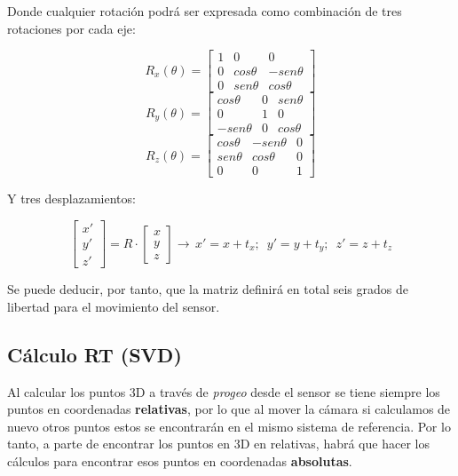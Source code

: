 Donde cualquier rotación podrá ser expresada como combinación de tres rotaciones por cada eje:

\begin{equation}
R_{x}(\theta)=\left[\begin{array}{ccc}
1 & 0 & 0\\
0 & cos\theta & -sen\theta\\
0 & sen\theta & cos\theta
\end{array}\right]
\end{equation}
\begin{equation}
R_{y}(\theta)=\left[\begin{array}{ccc}
cos\theta & 0 & sen\theta\\
0 & 1 & 0\\
-sen\theta & 0 & cos\theta
\end{array}\right]
\end{equation}
\begin{equation}
R_{z}(\theta)=\left[\begin{array}{ccc}
cos\theta & -sen\theta & 0\\
sen\theta & cos\theta & 0\\
0 & 0 & 1
\end{array}\right]
\end{equation}

Y tres desplazamientos:

\begin{equation}
\left[\begin{array}{c}
x'\\
y'\\
z'
\end{array}\right]=R\cdot\left[\begin{array}{c}
x\\
y\\
z
\end{array}\right]\longrightarrow\, x'=x+t_{x};\,\,\, y'=y+t_{y};\,\,\, z'=z+t_{z}
\end{equation}

Se puede deducir, por tanto, que la matriz definirá en total seis grados de libertad para el movimiento del sensor.

\subsection{Cálculo RT (SVD)}

Al calcular los puntos 3D a través de \textit{progeo} desde el sensor se tiene siempre los puntos en coordenadas \textbf{relativas}, por lo que al mover la cámara si calculamos de nuevo otros puntos estos se encontrarán en el mismo sistema de referencia. Por lo tanto, a parte de encontrar los puntos en 3D en relativas, habrá que hacer los cálculos para encontrar esos puntos en coordenadas \textbf{absolutas}.

